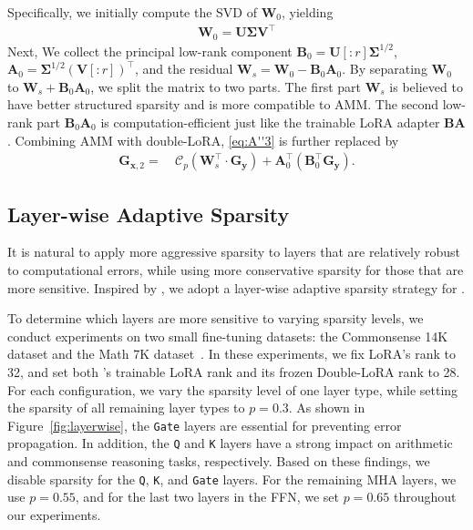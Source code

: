 Specifically, we initially compute the SVD of $\mathbf{W}_0$, yielding
\begin{align*}
    \mathbf{W}_0=\mathbf{U}\mathbf{\Sigma} \mathbf{V}^\top
\end{align*}
Next, We collect the principal low-rank component $\mathbf{B}_0=\mathbf{U}[:r]\mathbf{\Sigma}^{1/2}$, $\mathbf{A}_0=\mathbf{\Sigma}^{1/2}(\mathbf{V}[:r])^\top$, and the residual $\mathbf{W}_{s}=\mathbf{W}_0-\mathbf{B}_0\mathbf{A}_0$. By separating $\mathbf{W}_0$ to $\mathbf{W}_s+\mathbf{B}_0\mathbf{A}_0$, we split the matrix to two parts. The first part $\mathbf{W}_s$ is believed to have better structured sparsity and is more compatible to AMM. The second low-rank part $\mathbf{B}_0\mathbf{A}_0$ is computation-efficient just like the trainable LoRA adapter $\mathbf{B}\mathbf{A}$. Combining AMM with double-LoRA, \eqref{eq:A''3} is further replaced by
\begin{align}
\mathbf{G}_{\mathbf{x},2}=&\ \mathcal{C}_p(\mathbf{W}_s^\top\cdot \mathbf{G}_\mathbf{y})+\mathbf{A}_0^\top(\mathbf{B}_0^\top \mathbf{G}_\mathbf{y}).\label{eq:A'''3}
\end{align}


\subsection{Layer-wise Adaptive Sparsity}

It is natural to apply more aggressive sparsity to layers that are relatively robust to computational errors, while using more conservative sparsity for those that are more sensitive.
% 
Inspired by \cite{hu2025accelerating,ma2024first,jaiswal2024galore,zeng2024lsaq,malinovskii2024pushing,zhang2024q,liu2024training}, we adopt a layer-wise adaptive sparsity strategy for \celora.


To determine which layers are more sensitive to varying sparsity levels, we conduct experiments on two small fine-tuning datasets: the Commonsense 14K dataset and the Math 7K dataset~\cite{hu2023llm}.
% 
In these experiments, we fix LoRA's rank to 32, and set both \celora's trainable LoRA rank and its frozen Double-LoRA rank to 28. 
% 
For each \celora configuration, we vary the sparsity level of one layer type, while setting the sparsity of all remaining layer types to $p=0.3$.
As shown in Figure~\ref{fig:layerwise}, the \texttt{Gate} layers are essential for preventing error propagation. 
% 
In addition, the \texttt{Q} and \texttt{K} layers have a strong impact on arithmetic and commonsense reasoning tasks, respectively. 
% 
Based on these findings, we disable sparsity for the \texttt{Q}, \texttt{K}, and \texttt{Gate} layers. 
For the remaining MHA layers, we use $p=0.55$, and for the last two layers in the FFN, we set $p=0.65$ throughout our experiments.




